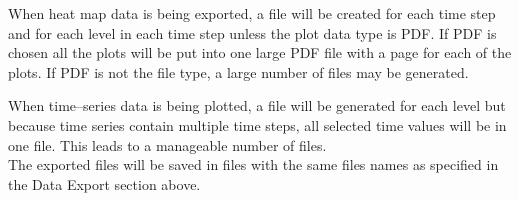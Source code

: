 \documentclass[../00_main.tex]{subfiles}
\begin{document}
When heat map data is being exported, a file will be created for each time step
and for each level in each time step unless the plot data type is PDF. If PDF
is chosen all the plots will be put into one large PDF file with a page for
each of the plots. If PDF is not the file type, a large number of
files may be generated.\newline

When time--series data is being plotted, a file will be generated for each
level but because time series contain multiple time steps, all selected time 
values will be in one file. This leads to a manageable number of
files.\\
The exported files will be saved in files with the same files names as
specified in the Data Export section above.\newline
\end{document}
